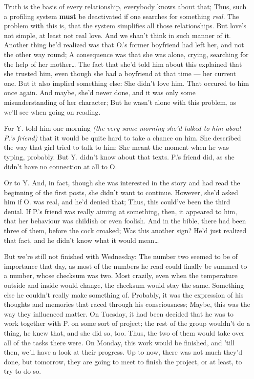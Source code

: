 Truth is the basis of every relationship, everybody knows about that; Thus, such a profiling system \textbf{must} be deactivated if one searches for something \emph{real}. The problem with this is, that the system simplifies all those relationships. 
But love's not simple, at least not real love. 
And we shan't think in such manner of it. 
Another thing he'd realized was that O.'s former boyfriend had left her, and not the other way round; A consequence was that she was alone, crying, searching for the help of her mother\dots{}
The fact that she'd told him about this explained that she trusted him, even though she had a boyfriend at that time --- her current one. But it also implied something else: She didn't love him. 
That occured to him once again.
And maybe, she'd never done, and it was only some misunderstanding of her character; But he wasn't alone with this problem, as we'll see when going on reading.

For Y. told him one morning \emph{(the very same morning she'd talked to him about P.'s friend)} that it would be quite hard to take a chance on him. She described the way that girl tried to talk to him; She meant the moment when he was typing, probably. But Y. didn't know about that texts. 
P.'s friend did, as she didn't have no connection at all to O.

Or to Y. And, in fact, though she was interested in the story and had read the beginning of the first posts, she didn't want to continue. However, she'd asked him if O. was real, and he'd denied that; Thus, this could've been the third denial. If P.'s friend was really aiming at something, then, it appeared to him, that her behaviour was childish or even foolish. 
And in the bible, there had been three of them, before the cock croaked; Was this another sign?
He'd just realized that fact, and he didn't know what it would mean\dots{}

But we're still not finished with Wednesday: The number two seemed to be of importance that day, as most of the numbers he read could finally be summed to a number, whose checksum was two. Most crazily, even when the temperature outside and inside would change, the checksum would stay the same. 
Something else he couldn't really make something of. 
Probably, it was the expression of his thoughts and memories that raced through his consciousness; Maybe, this was the way they influenced matter. 
On Tuesday, it had been decided that he was to work together with P. on some sort of project; the rest of the group wouldn't do a thing, he knew that, and she did so, too. 
Thus, the two of them would take over all of the tasks there were. 
On Monday, this work would be finished, and 'till then, we'll have a look at their progress. Up to now, there was not much they'd done, but tomorrow, they are going to meet to finish the project, or at least, to try to do so.

